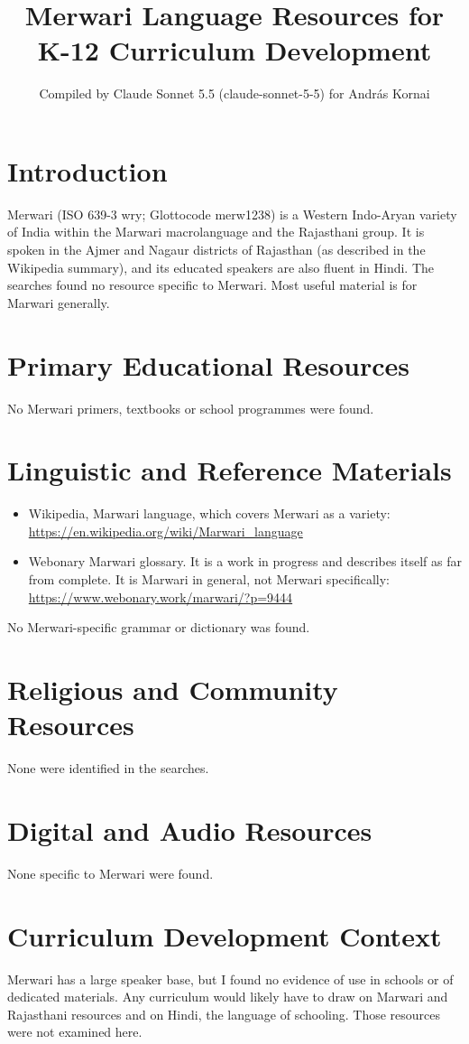 \documentclass[12pt]{article}
\title{Merwari Language Resources for K-12 Curriculum Development}
\author{Compiled by Claude Sonnet 5.5 (claude-sonnet-5-5) for Andr\'as Kornai}
\date{}
\begin{document}
\maketitle

\section{Introduction}
Merwari (ISO 639-3 wry; Glottocode merw1238) is a Western Indo-Aryan variety of India within the Marwari macrolanguage and the Rajasthani group. It is spoken in the Ajmer and Nagaur districts of Rajasthan (as described in the Wikipedia summary), and its educated speakers are also fluent in Hindi. The searches found no resource specific to Merwari. Most useful material is for Marwari generally.

\section{Primary Educational Resources}
No Merwari primers, textbooks or school programmes were found.

\section{Linguistic and Reference Materials}
\begin{itemize}
\item Wikipedia, Marwari language, which covers Merwari as a variety: \url{https://en.wikipedia.org/wiki/Marwari_language}
\item Webonary Marwari glossary. It is a work in progress and describes itself as far from complete. It is Marwari in general, not Merwari specifically: \url{https://www.webonary.work/marwari/?p=9444}
\end{itemize}
No Merwari-specific grammar or dictionary was found.

\section{Religious and Community Resources}
None were identified in the searches.

\section{Digital and Audio Resources}
None specific to Merwari were found.

\section{Curriculum Development Context}
Merwari has a large speaker base, but I found no evidence of use in schools or of dedicated materials. Any curriculum would likely have to draw on Marwari and Rajasthani resources and on Hindi, the language of schooling. Those resources were not examined here.
\end{document}
